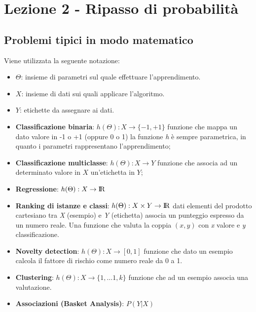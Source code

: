 \section{Lezione 2 - Ripasso di probabilità}\label{lezione-2---ripasso-di-probabilituxe0}

\subsection{Problemi tipici in modo matematico}\label{problemi-tipici-in-modo-matematico}

Viene utilizzata la seguente notazione:

\begin{itemize}
\item $\Theta$: insieme di parametri sul quale effettuare l'apprendimento.
\item $X$: insieme di dati sui quali applicare l'algoritmo.
\item $Y$: etichette da assegnare ai dati.
\end{itemize}

\begin{itemize}
\item \textbf{Classificazione binaria}: $h(\Theta): X \rightarrow \{-1,+1\}$ funzione
  che mappa un dato valore in -1 o +1 (oppure 0 o 1) la funzione
  \emph{h} è sempre parametrica, in quanto i parametri rappresentano
  l'apprendimento;
\item \textbf{Classificazione multiclasse}: $h(\Theta): X \rightarrow Y$ funzione che associa ad un determinato valore in $X$ un'etichetta in $Y$;
\item \textbf{Regressione}: $h(\Theta): X \rightarrow {\rm I\!R}$
\item \textbf{Ranking di istanze e classi}: $h(\Theta): X \times Y \rightarrow {\rm I\!R}$ dati elementi del
  prodotto cartesiano tra \textit{X} (esempio) e \textit{Y} (etichetta) associa un
  punteggio espresso da un numero reale. Una funzione che valuta la
  coppia $(x,y)$ con \emph{x} valore e \emph{y} classificazione.
\item \textbf{Novelty detection}: $h(\Theta): X \rightarrow [0,1]$  funzione che dato un esempio calcola il fattore di rischio come numero reale da 0 a 1.
\item \textbf{Clustering}: $h(\Theta): X \rightarrow \{1,\ldots1,k\}$ funzione che ad un esempio associa una valutazione.
\item \textbf{Associazioni (Basket Analysis)}: $P(Y|X)$
\end{itemize}

